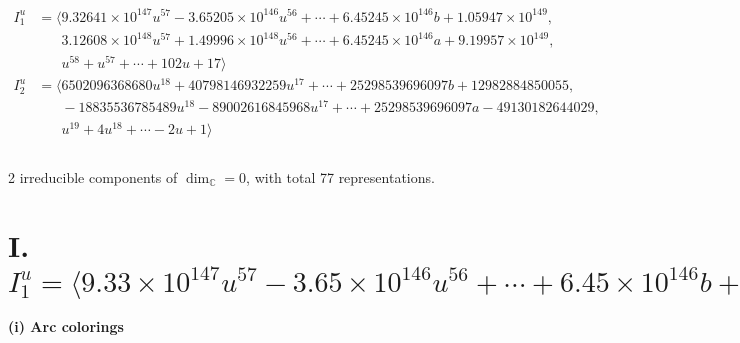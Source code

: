 \documentclass[1p]{elsarticle_modified}
\theoremstyle{definition}
\begin{document}
\begin{align*}
I^u_{1}&=\langle 
9.32641\times10^{147} u^{57}-3.65205\times10^{146} u^{56}+\cdots+6.45245\times10^{146} b+1.05947\times10^{149},\\
\phantom{I^u_{1}}&\phantom{= \langle  }3.12608\times10^{148} u^{57}+1.49996\times10^{148} u^{56}+\cdots+6.45245\times10^{146} a+9.19957\times10^{149},\\
\phantom{I^u_{1}}&\phantom{= \langle  }u^{58}+u^{57}+\cdots+102 u+17\rangle \\
I^u_{2}&=\langle 
6502096368680 u^{18}+40798146932259 u^{17}+\cdots+25298539696097 b+12982884850055,\\
\phantom{I^u_{2}}&\phantom{= \langle  }-18835536785489 u^{18}-89002616845968 u^{17}+\cdots+25298539696097 a-49130182644029,\\
\phantom{I^u_{2}}&\phantom{= \langle  }u^{19}+4 u^{18}+\cdots-2 u+1\rangle \\
\\
\end{align*}
\raggedright * 2 irreducible components of $\dim_{\mathbb{C}}=0$, with total 77 representations.\\
\newpage
\renewcommand{\arraystretch}{1}
\centering \section*{I. $I^u_{1}= \langle 9.33\times10^{147} u^{57}-3.65\times10^{146} u^{56}+\cdots+6.45\times10^{146} b+1.06\times10^{149},\;3.13\times10^{148} u^{57}+1.50\times10^{148} u^{56}+\cdots+6.45\times10^{146} a+9.20\times10^{149},\;u^{58}+u^{57}+\cdots+102 u+17 \rangle$}
\flushleft \textbf{(i) Arc colorings}\\
\end{document}
